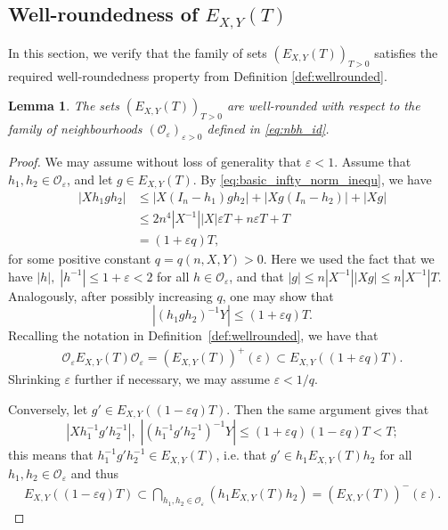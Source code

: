 \documentclass[11pt,reqno]{amsart}
\newtheorem{lem}[thm]{Lemma}
\theoremstyle{definition}
\theoremstyle{remark}
\numberwithin{equation}{section}
\numberwithin{thm}{section}
\numberwithin{table}{section}
\begin{document}
\subsection{Well-roundedness of $E_{X,Y}(T)$} 
In this section, we verify that the family of sets $(E_{X,Y}(T))_{T>0}$ satisfies the required well-roundedness property
from Definition  \ref{def:wellrounded}.

\begin{lem}\label{lem:wellroundedness}
    The sets $(E_{X,Y}(T))_{T>0}$ are well-rounded with respect to the family of neighbourhoods $(\mathcal{O}_\varepsilon)_{\varepsilon>0}$ defined in \eqref{eq:nbh_id}.
\end{lem}
 \begin{proof}
     We may assume without loss of generality that $\varepsilon < 1$. 
Assume that $h_1, h_2 \in \mathcal{O}_\varepsilon$, and let $g \in E_{X,Y}(T)$. By \eqref{eq:basic_infty_norm_inequ}, we have
\begin{align*}
    | X h_1 g h_2|
    &\le 
    | X (I_n-h_1) g h_2| + 
     | X g (I_n-h_2)|
     + | Xg | \\
     &\le 
     2 n^4 |X^{-1}|  |X| \varepsilon T 
     + 
     n \varepsilon T
     + T  \\
     & = (1+\varepsilon q)T,
\end{align*}
for some positive constant $q = q(n,X,Y)>0$.
Here we used the fact that we have  $|h|, \; |h^{-1}| \le 1 + \varepsilon < 2$ for all $h \in \mathcal{O}_\varepsilon$, and that $| g | \le n |X^{-1}| |Xg| \le n |X^{-1}|  T$.
Analogously, after possibly increasing $q$, one may show that 
\[
    |  (h_1 g h_2)^{-1} Y| \le (1+\varepsilon q)T.
\]
Recalling the notation in Definition~\ref{def:wellrounded}, we have that 
\begin{align}\label{eq:B+subset}
\mathcal{O}_\varepsilon E_{X,Y}(T) \mathcal{O}_\varepsilon  =  (E_{X,Y}(T))^{+}(\varepsilon) \subset E_{X,Y}((1+\varepsilon q)T).
\end{align}
Shrinking $\varepsilon$ further if necessary, we may assume $\varepsilon < 1/q$.

Conversely, let $g' \in E_{X,Y}((1-\varepsilon q)T)$. Then the same argument  gives that 
\[
    | X h_1^{-1} g' h_2^{-1}|, \;
     |  (h_1^{-1} g' h_2^{-1})^{-1} Y| \le (1+\varepsilon q)(1-\varepsilon q)T < T;
\]
this means that $h_1^{-1} g' h_2^{-1} \in E_{X,Y}(T)$, i.e. that $ g' \in h_1 E_{X,Y}(T) h_2$ for all $h_1, h_2 \in \mathcal{O}_\varepsilon$ and thus
\begin{align}\label{eq:B-inclusion}
E_{X,Y}((1-\varepsilon q)T)
\subset
    \bigcap_{h_1, h_2 \in \mathcal{O}_\varepsilon} (h_1 E_{X,Y}(T) h_2) = (E_{X,Y}(T))^-(\varepsilon)   .
\end{align}


\end{proof}
\end{document}
